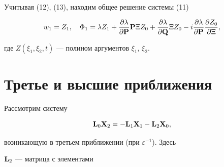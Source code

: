  


Учитывая (12), (13), находим общее решение системы (11) 


\begin{equation} 


w_1=Z_1,\quad \Phi_1=\lambda Z_1+ 


\frac{\partial\lambda}{\partial\BP}\BP\Xi Z_0+ 


\frac{\partial\lambda}{\partial\BQ}\Xi Z_0- 


i\frac{\partial\lambda}{\partial\BP} 


\frac{\partial Z_0}{\partial\Xi}, 


\end{equation} 


где $Z(\xi_1,\xi_2,t)$ --- полином аргументов $\xi_1$, $\xi_2$. 


 


\section{Третье и высшие приближения} 


 


Рассмотрим систему 


\begin{equation} 


\BL_0\BX_2=-\BL_1\BX_1-\BL_2\BX_0, 


\end{equation} 


возникающую в третьем приближении (при $\varepsilon^{-1}$). Здесь 


$\bold L_2$ --- матрица с элементами 


